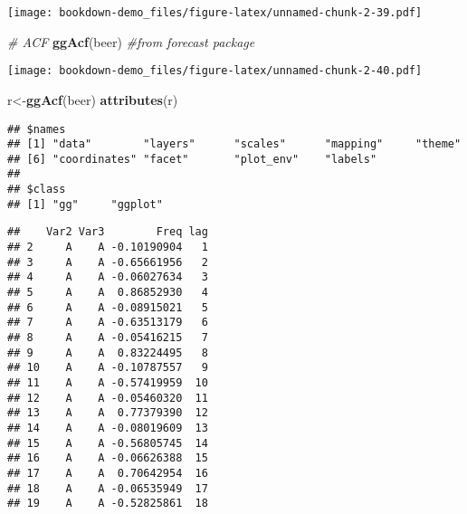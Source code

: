 \documentclass[]{book}
\newenvironment{Shaded}{\begin{snugshade}}{\end{snugshade}}
\newcommand{\CommentTok}[1]{\textcolor[rgb]{0.56,0.35,0.01}{\textit{#1}}}
\newcommand{\KeywordTok}[1]{\textcolor[rgb]{0.13,0.29,0.53}{\textbf{#1}}}
\newcommand{\NormalTok}[1]{#1}
\newcommand{\OperatorTok}[1]{\textcolor[rgb]{0.81,0.36,0.00}{\textbf{#1}}}
\begin{document}
\texttt{[image: bookdown-demo\_files/figure-latex/unnamed-chunk-2-39.pdf]}

\begin{Shaded}
\begin{Highlighting}[]
\CommentTok{# ACF}
  \KeywordTok{ggAcf}\NormalTok{(beer) }\CommentTok{#from forecast package}
\end{Highlighting}
\end{Shaded}

\texttt{[image: bookdown-demo\_files/figure-latex/unnamed-chunk-2-40.pdf]}

\begin{Shaded}
\begin{Highlighting}[]
\NormalTok{  r<-}\KeywordTok{ggAcf}\NormalTok{(beer)}
  \KeywordTok{attributes}\NormalTok{(r)  }
\end{Highlighting}
\end{Shaded}

\begin{verbatim}
## $names
## [1] "data"        "layers"      "scales"      "mapping"     "theme"      
## [6] "coordinates" "facet"       "plot_env"    "labels"     
## 
## $class
## [1] "gg"     "ggplot"
\end{verbatim}

\begin{Shaded}
\end{Shaded}

\begin{verbatim}
##    Var2 Var3        Freq lag
## 2     A    A -0.10190904   1
## 3     A    A -0.65661956   2
## 4     A    A -0.06027634   3
## 5     A    A  0.86852930   4
## 6     A    A -0.08915021   5
## 7     A    A -0.63513179   6
## 8     A    A -0.05416215   7
## 9     A    A  0.83224495   8
## 10    A    A -0.10787557   9
## 11    A    A -0.57419959  10
## 12    A    A -0.05460320  11
## 13    A    A  0.77379390  12
## 14    A    A -0.08019609  13
## 15    A    A -0.56805745  14
## 16    A    A -0.06626388  15
## 17    A    A  0.70642954  16
## 18    A    A -0.06535949  17
## 19    A    A -0.52825861  18
\end{verbatim}

\begin{Shaded}
\end{Shaded}
\end{document}
